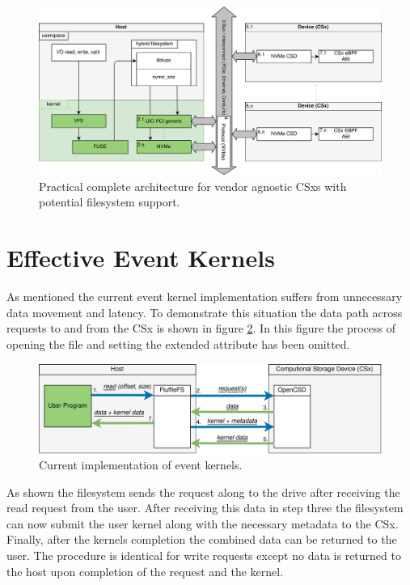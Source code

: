 \begin{figure}
    \centering
	\includegraphics[width=1\textwidth]{resources/images/loader-pfs-arch-v3.png}
	\caption{Practical complete architecture for vendor agnostic CSxs with
        potential filesystem support.}
    \label{figure:practicalarchitecture}
\end{figure}

\section{Effective Event Kernels}

As mentioned the current event kernel implementation suffers from unnecessary
data movement and latency. To demonstrate this situation the data path across
requests to and from the CSx is shown in figure
\ref{figure:currenteventkernels}. In this figure the process of opening the file
and setting the extended attribute has been omitted.

\begin{figure}
    \centering
	\includegraphics[width=1\textwidth]{resources/images/current-event-kernel.png}
	\caption{Current implementation of event kernels.}
    \label{figure:currenteventkernels}
\end{figure}

As shown the filesystem sends the request along to the drive after receiving the
read request from the user. After receiving this data in step three the
filesystem can now submit the user kernel along with the necessary metadata to
the CSx. Finally, after the kernels completion the combined data can be returned
to the user. The procedure is identical for write requests except no data is
returned to the host upon completion of the request and the kernel.

